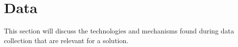 \section{Data}

This section will discuss the technologies and mechanisms found during data collection that are relevant for a solution.





